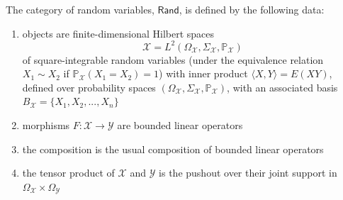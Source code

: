 \documentclass[sigconf]{acmart}
\newcommand{\Cat}[1]{\mathsf{#1}}
\def\Rand{\Cat{Rand}}
\def\Cor{\textnormal{Cor}}
\begin{document}
\begin{definition}
The category of random variables, $\Rand$, is defined by the following data:
\begin{enumerate}
\item objects are finite-dimensional Hilbert spaces \[ \mathcal{X} = L^2(\Omega_\mathcal{X}, \Sigma_\mathcal{X}, \mathbb{P}_\mathcal{X})\] of square-integrable random variables (under the equivalence relation $X_1 \sim X_2$ if $\mathbb{P}_\mathcal{X}(X_1 = X_2) = 1$) with inner product $\langle X,Y\rangle = E(XY)$, defined over probability spaces $(\Omega_\mathcal{X}, \Sigma_\mathcal{X}, \mathbb{P}_\mathcal{X})$, with an associated basis $B_\mathcal{X} = \{ X_1, X_2, ..., X_n \}$
\item morphisms $F: \mathcal{X} \to \mathcal{Y}$ are bounded linear operators
\item the composition is the usual composition of bounded linear operators
\item the tensor product of $\mathcal{X}$ and $\mathcal{Y}$ is the pushout over their joint support in $\Omega_\mathcal{X} \times \Omega_\mathcal{Y}$





\end{enumerate}
\end{definition}
\end{document}
